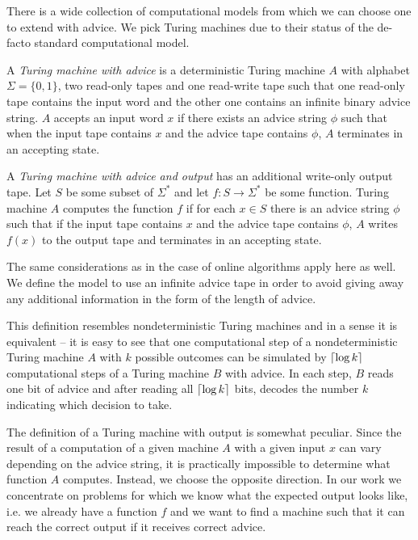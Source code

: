 There is a wide collection of computational models from which we can
choose one to extend with advice. We pick Turing machines due to their
status of the de-facto standard computational model.

\begin{definition}\label{definition:turing-advice}
    A \emph{Turing machine with advice} is a deterministic Turing machine
    $A$ with alphabet $\Sigma = \{0,1\}$, two read-only tapes and one
    read-write tape such that one read-only tape contains the input word
    and the other one contains an infinite binary advice string. $A$
    accepts an input word $x$ if there exists an advice string $\phi$ such
    that when the input tape contains $x$ and the advice tape contains
    $\phi$, $A$ terminates in an accepting state.

    A \emph{Turing machine with advice and output} has an additional
    write-only output tape. Let $S$ be some subset of $\Sigma^*$ and let
    $f: S \to \Sigma^*$ be some function. Turing machine $A$ computes the
    function $f$ if for each $x \in S$ there is an advice string $\phi$
    such that if the input tape contains $x$ and the advice tape contains
    $\phi$, $A$ writes $f(x)$ to the output tape and terminates in an
    accepting state.
\end{definition}

The same considerations as in the case of online algorithms apply here as
well. We define the model to use an infinite advice tape in order to avoid
giving away any additional information in the form of the length of
advice.

This definition resembles nondeterministic Turing machines and in a sense
it is equivalent -- it is easy to see that one computational step of a
nondeterministic Turing machine $A$ with $k$ possible outcomes can be
simulated by $\lceil\log{}k\rceil$ computational steps of a Turing machine $B$
with advice. In each step, $B$ reads one bit of advice and after reading
all $\lceil\log{}k\rceil$ bits, decodes the number $k$ indicating which
decision to take.

The definition of a Turing machine with output is somewhat peculiar. Since
the result of a computation of a given machine $A$ with a given input $x$
can vary depending on the advice string, it is practically impossible to
determine what function $A$ computes. Instead, we choose the opposite
direction. In our work we concentrate on problems for which we know what
the expected output looks like, i.e. we already have a function $f$ and we
want to find a machine such that it can reach the correct output if it
receives correct advice.

